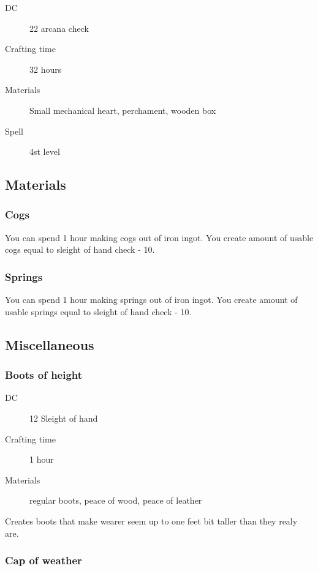 \begin{description}
\item [DC] 22 arcana check
\item [Crafting time] 32 hours
\item [Materials] Small mechanical heart, perchament, wooden box
\item [Spell] 4st level
\end{description}

\subsection{Materials}

\subsubsection{Cogs}

You can spend 1 hour making cogs out of iron ingot. You create amount of usable cogs equal to sleight of hand check - 10.

\subsubsection{Springs}

You can spend 1 hour making springs out of iron ingot. You create amount of usable springs equal to sleight of hand check - 10.

\subsection{Miscellaneous}

\subsubsection{Boots of height}

\begin{description}
\item [DC] 12 Sleight of hand
\item [Crafting time] 1 hour
\item [Materials] regular boots, peace of wood, peace of leather
\end{description}

Creates boots that make wearer seem up to one feet bit taller than they realy are.

\subsubsection{Cap of weather}

